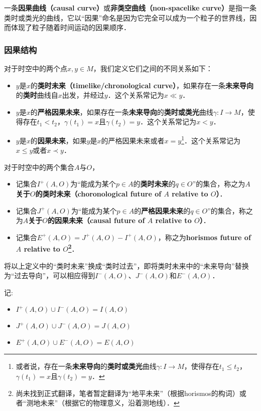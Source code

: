 一条\textbf{因果曲线（causal curve）}或\textbf{非类空曲线（non-spacelike curve）}是指一条类时或类光的曲线，它以“因果”命名是因为它完全可以成为一个粒子的世界线，因而体现了粒子随着时间运动的因果顺序．


\subsubsection{因果结构}

对于时空中的两个点$x, y\in M$，我们定义它们之间的不同关系如下：

\begin{itemize}
\item $y$是$x$的\textbf{类时未来（timelike/chronological curve）}，如果存在一条\textbf{未来导向}的\textbf{类时}曲线自$x$出发，并经过$y$．这个关系常记为$x\ll y$．
\item $y$是$x$的\textbf{严格因果未来}，如果存在一条\textbf{未来导向}的\textbf{类时或类光}曲线$\gamma:I\rightarrow M$，使得存在$t_1<t_2$，$\gamma(t_1)=x$且$\gamma(t_2)=y$．这个关系常记为$x< y$．
\item $y$是$x$的\textbf{因果未来}，如果$y$是$x$的严格因果未来或者$x=y$\footnote{或者说，存在一条\textbf{未来导向}的\textbf{类时或类光}曲线$\gamma:I\rightarrow M$，使得存在$t_1\leq t_2$，$\gamma(t_1)=x$且$\gamma(t_2)=y$．}．这个关系常记为$x\leq y$或者$x\prec y$．
\end{itemize}

对于时空中的两个集合$A$与$O$，


\begin{itemize}
\item 记集合$I^+(A, O)$为“能成为某个$p\in A$的\textbf{类时未来}的$q\in O$”的集合，称之为\textbf{$A$关于$O$的类时未来（choronological future of $A$ relative to $O$）}．
\item 记集合$J^+(A, O)$为“能成为某个$p\in A$的\textbf{严格因果未来}的$q\in O$”的集合，称之为\textbf{$A$关于$O$的因果未来（causal future of $A$ relative to $O$）}．
\item 记集合$E^+(A, O)=J^+(A, O)-I^+(A, O)$，称之为\textbf{horismos future of $A$ relative to $O$\footnote{尚未找到正式翻译，笔者暂定翻译为“地平未来”（根据horismos的构词）或者“测地未来”（根据它的物理意义，沿着测地线）．}}．
\end{itemize}

将以上定义中的“类时未来”换成“类时过去”，即将类时未来中的“未来导向”替换为“过去导向”，可以相应得到$I^-(A, O)$、$J^-(A, O)$和$E^-(A, O)$．

记:
\begin{itemize}
\item $I^+(A, O)\cup I^-(A, O)=I(A,O)$
\item $J^+(A, O)\cup J^-(A, O)=J(A,O)$
\item $E^+(A, O)\cup E^-(A, O)=E(A,O)$
\end{itemize}

